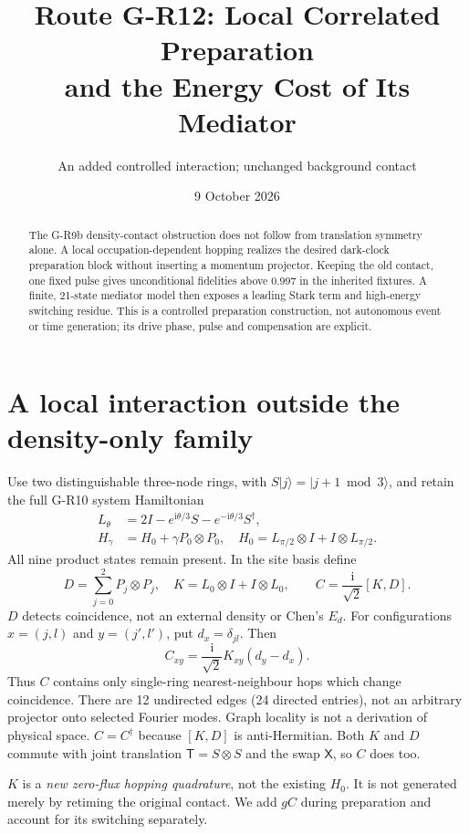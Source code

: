 \documentclass[11pt,a4paper]{article}
\title{Route G-R12: Local Correlated Preparation\\and the Energy Cost of Its Mediator}
\author{An added controlled interaction; unchanged background contact}
\date{9 October 2026}
\newcommand{\ii}{\mathrm i}
\newcommand{\ket}[1]{|#1\rangle}
\begin{document}
\maketitle
\begin{abstract}
The G-R9b density-contact obstruction does not follow from translation
symmetry alone. A local occupation-dependent hopping realizes the desired
dark-clock preparation block without inserting a momentum projector.
Keeping the old contact, one fixed pulse gives unconditional fidelities
above $0.997$ in the inherited fixtures. A finite, 21-state mediator model
then exposes a leading Stark term and high-energy switching residue.
This is a controlled preparation construction, not autonomous event or
time generation; its drive phase, pulse and compensation are explicit.
\end{abstract}

\section{A local interaction outside the density-only family}
Use two distinguishable three-node rings, with $S\ket j=\ket{j+1\bmod3}$,
and retain the full G-R10 system Hamiltonian
\begin{align}
 L_\theta&=2I-e^{\ii\theta/3}S-e^{-\ii\theta/3}S^\dagger,\\
 H_\gamma&=H_0+\gamma P_0\otimes P_0,\quad
 H_0=L_{\pi/2}\otimes I+I\otimes L_{\pi/2}.\label{original}
\end{align}
All nine product states remain present. In the site basis define
\begin{equation}
 D=\sum_{j=0}^2 P_j\otimes P_j,\quad
 K=L_0\otimes I+I\otimes L_0,\qquad C=\frac{\ii}{\sqrt2}[K,D].\label{local}
\end{equation}
$D$ detects coincidence, not an external density or Chen's $E_d$.
For configurations $x=(j,l)$ and $y=(j',l')$, put $d_x=\delta_{jl}$.
Then
\begin{equation}
 C_{xy}=\frac{\ii}{\sqrt2}K_{xy}(d_y-d_x).\label{edges}
\end{equation}
Thus $C$ contains only single-ring nearest-neighbour hops which change
coincidence. There are 12 undirected edges (24 directed entries), not
an arbitrary projector onto selected Fourier modes. Graph locality is
not a derivation of physical space. $C=C^\dagger$ because $[K,D]$ is
anti-Hermitian. Both $K$ and $D$ commute with joint translation
$\mathsf T=S\otimes S$ and the swap $\mathsf X$, so $C$ does too.

$K$ is a \emph{new zero-flux hopping quadrature}, not the existing
$H_0$. It is not generated merely by retiming the original contact.
We add $gC$ during preparation and account for its switching separately.
\end{document}
